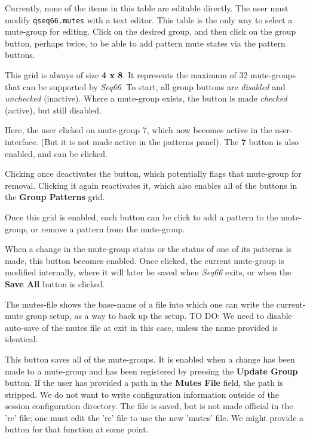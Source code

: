    Currently, none of the items in this table are editable directly.
   The user must modify \texttt{qseq66.mutes} with a text editor.
   This table is the only way to select a mute-group for editing.
   Click on the desired group, and then click on the group button, perhaps
   twice, to be able to add pattern mute states via the pattern buttons.

   This grid is always of size \textbf{4 x 8}.  It represents the maximum of 32
   mute-groups that can be supported by \textsl{Seq66}.
   To start, all group buttons are \textsl{disabled} and
   \textsl{unchecked} (inactive).
   Where a mute-group exists, the button is made \textsl{checked} (active),
   but still disabled.

   Here, the user clicked on mute-group 7, which now becomes active in the
   user-interface.  (But it is not made active in the patterns panel).
   The \textbf{7} button is also enabled, and can be clicked.

   Clicking once deactivates the button, which potentially flags that mute-group
   for removal.  Clicking it again reactivates it, which also enables all of the
   buttons in the \textbf{Group Patterns} grid.

   Once this grid is enabled, each button can be click to add a pattern to the
   mute-group, or remove a pattern from the mute-group.

%
%
   When a change in the mute-group status or the status of one of its patterns
   is made, this button becomes enabled.  Once clicked, the current mute-group
   is modified internally, where it will later be saved when \textsl{Seq66}
   exits, or when the \textbf{Save All} button is clicked.

   The mutes-file shows the base-name of a file into which one can write the
   current-mute group setup, as a way to back up the setup.
   TO DO:  We need to disable auto-save of the mutes file at exit in this case,
   unless the name provided is identical.

%
%
   This button saves all of the mute-groups.
   It is enabled when a change has been made to a mute-group and
   has been registered by pressing the \textbf{Update Group} button.
   If the user has provided a path in the \textbf{Mutes File} field, the path
   is stripped.  We do not want to write configuration information outside of
   the session configuration directory.
   The file is saved, but is not made official in the
   'rc' file; one must edit the 'rc' file to use the new 'mutes' file.
   We might provide a button for that function at some point.

